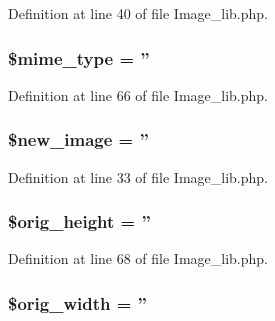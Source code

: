 Definition at line 40 of file Image\-\_\-lib.\-php.

\hypertarget{class_c_i___image__lib_a4d1985caafb49b059e3ca3dedfee257a}{
\subsubsection[{\$mime\-\_\-type}]{\setlength{\rightskip}{0pt plus 5cm}\$mime\-\_\-type = ''}}\label{class_c_i___image__lib_a4d1985caafb49b059e3ca3dedfee257a}


Definition at line 66 of file Image\-\_\-lib.\-php.

\hypertarget{class_c_i___image__lib_a6147ac30032312f2b42a9b05618faf12}{
\subsubsection[{\$new\-\_\-image}]{\setlength{\rightskip}{0pt plus 5cm}\$new\-\_\-image = ''}}\label{class_c_i___image__lib_a6147ac30032312f2b42a9b05618faf12}


Definition at line 33 of file Image\-\_\-lib.\-php.

\hypertarget{class_c_i___image__lib_a68713f45d7d236dfdd6aafdc9668a44d}{
\subsubsection[{\$orig\-\_\-height}]{\setlength{\rightskip}{0pt plus 5cm}\$orig\-\_\-height = ''}}\label{class_c_i___image__lib_a68713f45d7d236dfdd6aafdc9668a44d}


Definition at line 68 of file Image\-\_\-lib.\-php.

\hypertarget{class_c_i___image__lib_a336a3be3539aaae0ad42aaf4c544bb41}{
\subsubsection[{\$orig\-\_\-width}]{\setlength{\rightskip}{0pt plus 5cm}\$orig\-\_\-width = ''}}\label{class_c_i___image__lib_a336a3be3539aaae0ad42aaf4c544bb41}


